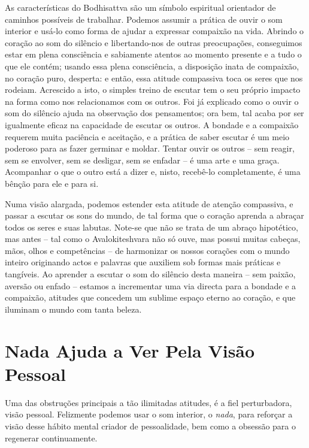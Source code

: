 As características do Bodhisattva são um símbolo espiritual orientador
de caminhos possíveis de trabalhar. Podemos assumir a prática de ouvir o
som interior e usá-lo como forma de ajudar a expressar compaixão na
vida. Abrindo o coração ao som do silêncio e libertando-nos de outras
preocupações, conseguimos estar em plena consciência e sabiamente
atentos ao momento presente e a tudo o que ele contém; usando essa plena
consciência, a disposição inata de compaixão, no coração puro, desperta:
e então, essa atitude compassiva toca os seres que nos rodeiam.
Acrescido a isto, o simples treino de escutar tem o seu próprio impacto
na forma como nos relacionamos com os outros. Foi já explicado como o
ouvir o som do silêncio ajuda na observação dos pensamentos; ora bem,
tal acaba por ser igualmente eficaz na capacidade de escutar os outros.
A bondade e a compaixão requerem muita paciência e aceitação, e a
prática de saber escutar é um meio poderoso para as fazer germinar e
moldar. Tentar ouvir os outros -- sem reagir, sem se envolver, sem se
desligar, sem se enfadar -- é uma arte e uma graça. Acompanhar o que o
outro está a dizer e, nisto, recebê-lo completamente, é uma bênção para
ele e para si.

Numa visão alargada, podemos estender esta atitude de atenção
compassiva, e passar a escutar os sons do mundo, de tal forma que o
coração aprenda a abraçar todos os seres e suas labutas. Note-se que não
se trata de um abraço hipotético, mas antes -- tal como o
Avalokiteshvara não só ouve, mas possui muitas cabeças, mãos, olhos e
competências -- de harmonizar os nossos corações com o mundo inteiro
originando actos e palavras que auxiliem sob formas mais práticas e
tangíveis. Ao aprender a escutar o som do silêncio desta maneira -- sem
paixão, aversão ou enfado -- estamos a incrementar uma via directa para
a bondade e a compaixão, atitudes que concedem um sublime espaço eterno
ao coração, e que iluminam o mundo com tanta beleza.

\section{Nada Ajuda a Ver Pela Visão Pessoal}

Uma das obstruções principais a tão ilimitadas atitudes, é a fiel
perturbadora, visão pessoal. Felizmente podemos usar o som interior, o
\emph{nada}, para reforçar a visão desse hábito mental criador de
pessoalidade, bem como a obsessão para o regenerar continuamente.

